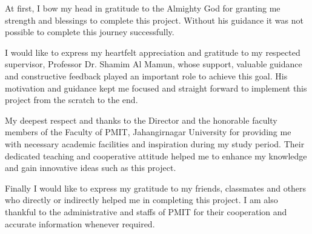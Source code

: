 	
	At first, I bow my head in gratitude to the Almighty God for granting me strength and blessings to complete this project. Without his guidance it was not possible to complete this journey successfully.
	
	I would like to express my heartfelt appreciation and gratitude to my respected supervisor, Professor Dr. Shamim Al Mamun, whose support, valuable guidance and constructive feedback played an important role to achieve this goal. His motivation and guidance kept me focused and straight forward to implement this project from the scratch to the end.
	
	
	
	My deepest respect and thanks to the Director and the honorable faculty members of the Faculty of PMIT, Jahangirnagar University for providing me with necessary academic facilities and inspiration during my study period. Their dedicated teaching and cooperative attitude helped me to enhance my knowledge and gain innovative ideas such as this project.
	
	Finally I would like to express my gratitude to my friends, classmates and others who directly or indirectly helped me in completing this project. I am also thankful to the administrative and staffs of PMIT for their cooperation and accurate information whenever required.
	
	